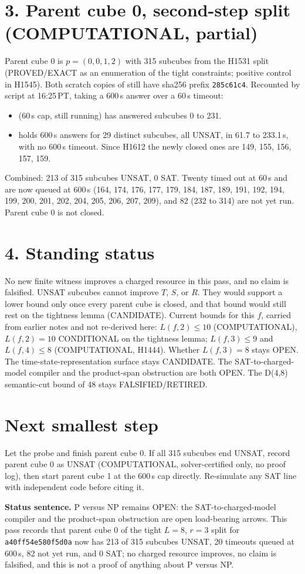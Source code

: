 \documentclass[11pt]{article}
\begin{document}
\section*{3. Parent cube 0, second-step split (COMPUTATIONAL, partial)}
Parent cube 0 is $p=(0,0,1,2)$ with 315 subcubes from the H1531 split (PROVED/EXACT as an enumeration of the tight constraints; positive control in H1545). Both scratch copies of  still have sha256 prefix \texttt{285c61c4}. Recounted by script at 16:25\,PT, taking a 600\,s answer over a 60\,s timeout:
\begin{itemize}
\item {} (60\,s cap, still running) has answered subcubes 0 to 231.
\item {} holds 600\,s answers for 29 distinct subcubes, all UNSAT, in 61.7 to 233.1\,s, with no 600\,s timeout. Since H1612 the newly closed ones are 149, 155, 156, 157, 159.
\end{itemize}
Combined: 213 of 315 subcubes UNSAT, 0 SAT. Twenty timed out at 60\,s and are now queued at 600\,s (164, 174, 176, 177, 179, 184, 187, 189, 191, 192, 194, 199, 200, 201, 202, 204, 205, 206, 207, 209), and 82 (232 to 314) are not yet run. Parent cube 0 is not closed.

\section*{4. Standing status}
No new finite witness improves a charged resource in this pass, and no claim is falsified. UNSAT subcubes cannot improve $T$, $S$, or $R$. They would support a lower bound only once every parent cube is closed, and that bound would still rest on the tightness lemma (CANDIDATE). Current bounds for this $f$, carried from earlier notes and not re-derived here: $L(f,2)\le 10$ (COMPUTATIONAL), $L(f,2)=10$ CONDITIONAL on the tightness lemma; $L(f,3)\le 9$ and $L(f,4)\le 8$ (COMPUTATIONAL, H1444). Whether $L(f,3)=8$ stays OPEN. The time-state-representation surface stays CANDIDATE. The SAT-to-charged-model compiler and the product-span obstruction are both OPEN. The D(4,8) semantic-cut bound of 48 stays FALSIFIED/RETIRED.

\section*{Next smallest step}
Let the probe and  finish parent cube 0. If all 315 subcubes end UNSAT, record parent cube 0 as UNSAT (COMPUTATIONAL, solver-certified only, no proof log), then start parent cube 1 at the 600\,s cap directly. Re-simulate any SAT line with independent code before citing it.

\bigskip
\noindent\textbf{Status sentence.} P versus NP remains OPEN: the SAT-to-charged-model compiler and the product-span obstruction are open load-bearing arrows. This pass records that parent cube 0 of the tight $L=8$, $r=3$ split for \texttt{a40ff54e580f5d0a} now has 213 of 315 subcubes UNSAT, 20 timeouts queued at 600\,s, 82 not yet run, and 0 SAT; no charged resource improves, no claim is falsified, and this is not a proof of anything about P versus NP.
\end{document}
